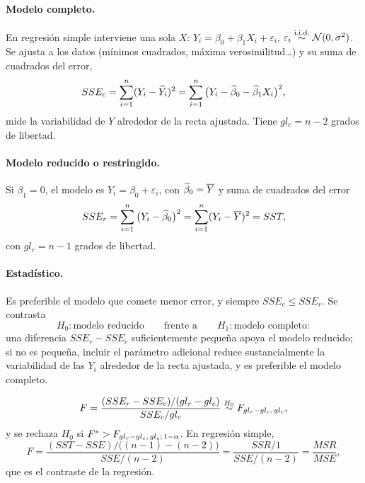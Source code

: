 \paragraph{Modelo completo.} En regresión simple interviene una sola $X$:
$Y_i=\beta_0+\beta_1X_i+\varepsilon_i$, $\varepsilon_i\overset{\text{i.i.d.}}{\sim}\mathcal{N}(0,\sigma^2)$. Se ajusta a los datos
(mínimos cuadrados, máxima verosimilitud\ldots) y su suma de cuadrados del error,
\[
  SSE_c = \sum_{i=1}^{n} (Y_i-\widehat{Y}_i)^2 = \sum_{i=1}^{n} \big(Y_i-\widehat{\beta}_0-\widehat{\beta}_1X_i\big)^2 ,
\]
mide la variabilidad de $Y$ alrededor de la recta ajustada. Tiene $gl_c=n-2$ grados de libertad.

\paragraph{Modelo reducido o restringido.} Si $\beta_1=0$, el modelo es
$Y_i=\beta_0+\varepsilon_i$, con $\widehat{\beta}_0=\overline{Y}$ y suma de cuadrados del error
\[
  SSE_r = \sum_{i=1}^{n} \big(Y_i-\widehat{\beta}_0\big)^2 = \sum_{i=1}^{n} (Y_i-\overline{Y})^2 = SST ,
\]
con $gl_r=n-1$ grados de libertad.

\paragraph{Estadístico.} Es preferible el modelo que comete menor error, y siempre
$SSE_c\le SSE_r$. Se contrasta
\[
  H_0\colon \text{modelo reducido} \qquad\text{frente a}\qquad H_1\colon\text{modelo completo}:
\]
una diferencia $SSE_r-SSE_c$ suficientemente pequeña apoya el modelo reducido; si no es pequeña,
incluir el parámetro adicional reduce sustancialmente la variabilidad de las $Y_i$ alrededor de
la recta ajustada, y es preferible el modelo completo.

\begin{resumen}
  \[
    F = \frac{(SSE_r-SSE_c)/(gl_r-gl_c)}{SSE_c/gl_c} \overset{H_0}{\sim} F_{gl_r-gl_c,\,gl_c},
  \]
  y se rechaza $H_0$ si $F^*>F_{gl_r-gl_c,\,gl_c;\,1-\alpha}$. En regresión simple,
  \[
    F = \frac{(SST-SSE)/\big((n-1)-(n-2)\big)}{SSE/(n-2)} = \frac{SSR/1}{SSE/(n-2)}
    = \frac{MSR}{MSE},
  \]
  que es el contraste de la regresión.
\end{resumen}
